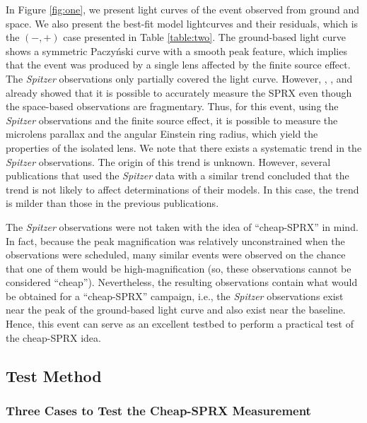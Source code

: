 \documentclass[10pt]{emulateapj}
\begin{document}
 In Figure \ref{fig:one}, we present light curves of the event observed from ground and space. 
We also present the best-fit model lightcurves and their residuals, which is the $(-,+)$ 
case presented in Table \ref{table:two}. The ground-based light curve shows a symmetric 
Paczy\'nski curve \citep{paczynski86} with a smooth peak feature, which implies that the 
event was produced by a single lens affected by the finite source effect. The {\it Spitzer} 
observations only partially covered the light curve. However, \citet{han17}, \citet{shin17}, and 
\citet{wang17} already showed that it is possible to accurately measure the SPRX even though the 
space-based observations are fragmentary. Thus, for this event, using the {\it Spitzer} observations 
and the finite source effect, it is possible to measure the microlens parallax and the angular 
Einstein ring radius, which yield the properties of the isolated lens. We note that there 
exists a systematic trend in the {\it Spitzer} observations. The origin of this trend is unknown. 
However, several publications that used the {\it Spitzer} data with a similar trend 
\citep[e.g.,][]{poleski16,shin17,shvartzvald17,zhu17} concluded that the trend is not likely 
to affect determinations of their models. In this case, the trend is milder than those in 
the previous publications.

 The {\it Spitzer} observations were not taken with the idea of ``cheap-SPRX'' in mind. In fact, 
because the peak magnification was relatively unconstrained when the observations were scheduled, 
many similar events were observed on the chance that one of them would be high-magnification 
(so, these observations cannot be considered ``cheap''). Nevertheless, the resulting observations 
contain what would be obtained for a ``cheap-SPRX'' campaign, i.e., the {\it Spitzer} observations 
exist near the peak of the ground-based light curve and also exist near the baseline. Hence, this 
event can serve as an excellent testbed to perform a practical test of the cheap-SPRX idea.

\subsection{Test Method}

\subsubsection{Three Cases to Test the Cheap-SPRX Measurement}
\end{document}

